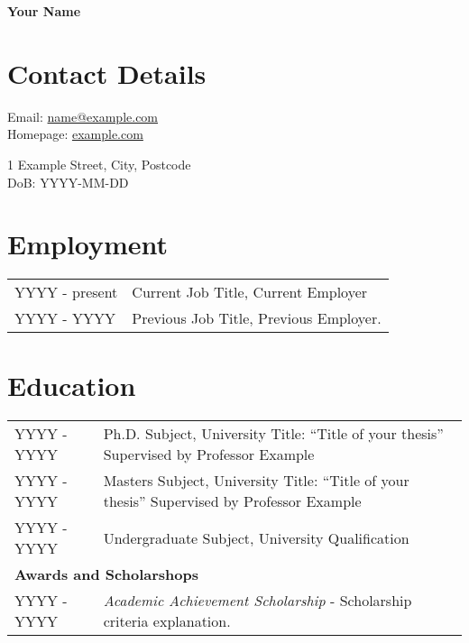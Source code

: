 \documentclass[a4paper,11pt,oneside]{article}
\newcommand{\email}[1]{\href{mailto:#1}{#1}}
\begin{document}
    \begin{center}
        \LARGE{\textbf{Your Name}}
    \end{center}

    \section*{Contact Details}
    \begin{minipage}{0.5\textwidth}
        Email: \email{name@example.com}\\
        Homepage: \href{https://example.com}{example.com}
    \end{minipage}
    \begin{minipage}{0.5\textwidth}
        1 Example Street, City, Postcode\\
        DoB: YYYY-MM-DD
    \end{minipage}

    \section*{Employment}
    \begin{tabularx}{\textwidth}{lX}
         YYYY - present & Current Job Title, Current Employer \\
         YYYY - YYYY    & Previous Job Title, Previous Employer.
    \end{tabularx}

    \section*{Education}
    \begin{tabularx}{\textwidth}{lX}
         YYYY - YYYY & Ph.D. Subject, University\newline
                       Title: ``Title of your thesis''\newline
                       Supervised by Professor Example\\
         YYYY - YYYY & Masters Subject, University\newline
                       Title: ``Title of your thesis''\newline
                       Supervised by Professor Example\\
         YYYY - YYYY & Undergraduate Subject, University\newline
                       Qualification\\
        \multicolumn{2}{l}{\textbf{Awards and Scholarshops} }\\
        YYYY - YYYY & \textit{Academic Achievement Scholarship} - Scholarship criteria explanation.
    \end{tabularx}
\end{document}

